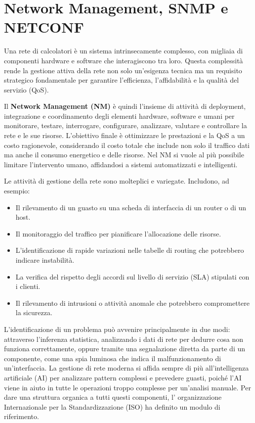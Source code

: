 \section{Network Management, SNMP e NETCONF}

Una rete di calcolatori è un sistema intrinsecamente complesso, con
migliaia di componenti hardware e software che interagiscono tra loro. 
Questa complessità rende la gestione
attiva della rete non solo un'esigenza tecnica ma un requisito strategico
fondamentale per garantire l'efficienza, l'affidabilità e la qualità del
servizio (QoS).

Il \textbf{Network Management (NM)} è quindi l'insieme di attività di deployment, 
integrazione e coordinamento degli elementi hardware, software e umani per monitorare, 
testare, interrogare, configurare, analizzare, valutare e controllare la rete e le sue
risorse. L'obiettivo finale è ottimizzare le prestazioni e la QoS a un costo
ragionevole, considerando il costo totale che include non solo il traffico dati
ma anche il consumo energetico e delle risorse. Nel NM si vuole al più possibile
limitare l'intervento umano, affidandosi a sistemi automatizzati e intelligenti.

Le attività di gestione della rete sono molteplici e variegate. Includono, ad
esempio:
\begin{itemize}
\item Il rilevamento di un guasto su una scheda di interfaccia di un router o
di un host.
\item Il monitoraggio del traffico per pianificare l'allocazione delle risorse.
\item L'identificazione di rapide variazioni nelle tabelle di routing che
potrebbero indicare instabilità.
\item La verifica del rispetto degli accordi sul livello di servizio (SLA)
stipulati con i clienti.
\item Il rilevamento di intrusioni o attività anomale che potrebbero
compromettere la sicurezza.
\end{itemize}

L'identificazione di un problema può avvenire principalmente in due modi:
attraverso l'inferenza statistica, analizzando i dati di rete per dedurre cosa
non funziona correttamente, oppure tramite una segnalazione diretta da parte di
un componente, come una spia luminosa che indica il malfunzionamento di
un'interfaccia. La gestione di rete moderna si affida sempre di più
all'intelligenza artificiale (AI) per analizzare pattern complessi e prevedere
guasti, poiché l'AI viene in aiuto in tutte le operazioni troppo complesse per
un'analisi manuale. Per dare una struttura organica a tutti questi componenti, l'
organizzazione Internazionale per la Standardizzazione (ISO) ha definito un modulo 
di riferimento.


